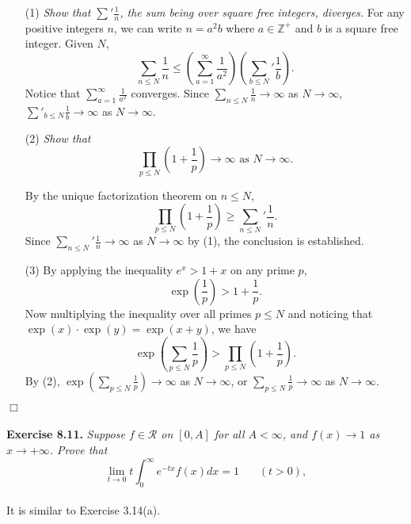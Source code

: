 \documentclass{article}
\begin{document}
\begin{enumerate}
\item[(1)]
\emph{Show that ${\sum}' \frac{1}{n}$, the sum being over square free integers, diverges.}
For any positive integers $n$, we can write $n = a^2 b$ where $a \in \mathbb{Z}^+$ and
$b$ is a square free integer.
Given $N$,
$$\sum_{n \leq N} \frac{1}{n}
\leq \left(\sum_{a = 1}^{\infty} \frac{1}{a^2} \right)
\left( {\sum_{b \leq N}}' \frac{1}{b} \right).$$
Notice that $\sum_{a = 1}^{\infty} \frac{1}{a^2}$ converges.
Since $\sum_{n \leq N} \frac{1}{n} \rightarrow \infty$ as $N \rightarrow \infty$,
$\sum'_{b \leq N}\frac{1}{b} \rightarrow \infty$ as $N \rightarrow \infty$.

\item[(2)]
\emph{Show that
\[
  \prod_{p \leq N} ( 1 + \frac{1}{p} ) \rightarrow \infty \text{ as } N \rightarrow \infty.
\]}

By the unique factorization theorem on $n \leq N$,
$$\prod_{p \leq N} \left( 1 + \frac{1}{p} \right)
\geq {\sum_{n \leq N}}' \frac{1}{n}.$$
Since ${\sum_{n \leq N}}' \frac{1}{n} \rightarrow \infty$ as $N \rightarrow \infty$ by (1),
the conclusion is established.

\item[(3)]
By applying the inequality $e^x > 1 + x$ on any prime $p$,
$$\exp\left(\frac{1}{p}\right) > 1 + \frac{1}{p}.$$
Now multiplying the inequality over all primes $p \leq N$ and noticing that
$\exp(x) \cdot \exp(y) = \exp(x + y)$, we have
$$\exp\left(\sum_{p \leq N} \frac{1}{p} \right)
> \prod_{p \leq N} \left( 1 + \frac{1}{p} \right).$$
By (2),
$\exp\left(\sum_{p \leq N} \frac{1}{p} \right) \rightarrow \infty$ as $N \rightarrow \infty$, or
$\sum_{p \leq N} \frac{1}{p} \rightarrow \infty$ as $N \rightarrow \infty$.
\end{enumerate}
$\Box$ \\\\






\textbf{Exercise 8.11.}
\emph{Suppose $f \in \mathscr{R}$ on $[0,A]$ for all $A < \infty$,
and $f(x) \to 1$ as $x \to +\infty$.
Prove that
\[
  \lim_{t \to 0} t \int_{0}^{\infty} e^{-tx}f(x)dx = 1
  \:\:\:\:\:\:\:\: (t > 0),
\]} \\

It is similar to Exercise 3.14(a). \\
\end{document}
